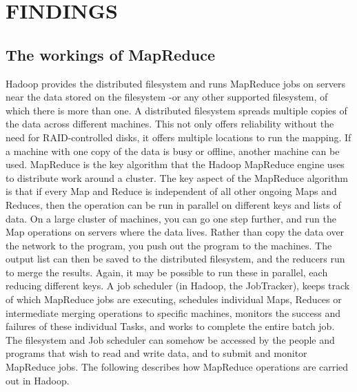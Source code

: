 \documentclass[a4paper,12pt,oneside]{report}
\begin{document}
\newpage
\section{FINDINGS}

\subsection{The workings of MapReduce}

Hadoop provides the distributed filesystem and runs MapReduce jobs on servers near the data stored on 
the filesystem -or any other supported filesystem, of which there is more than one.
A distributed filesystem spreads multiple copies of the data across different machines. This not only 
offers reliability without the need for RAID-controlled disks, it offers multiple locations to run the 
mapping. If a machine with one copy of the data is busy or offline, another machine can be used. 
MapReduce is the key algorithm that the Hadoop MapReduce engine uses to distribute work around a cluster. 
The key aspect of the MapReduce algorithm is that if every Map and Reduce is independent of all other 
ongoing Maps and Reduces, then the operation can be run in parallel on different keys and lists of data. 
On a large cluster of machines, you can go one step further, and run the Map operations on servers 
where the data lives. Rather than copy the data over the network to the program, you push out the program 
to the machines. The output list can then be saved to the distributed filesystem, and the reducers run 
to merge the results. Again, it may be possible to run these in parallel, each reducing different keys. 
A job scheduler (in Hadoop, the JobTracker), keeps track of which MapReduce jobs are executing, schedules 
individual Maps, Reduces or intermediate merging operations to specific machines, monitors the success 
and failures of these individual Tasks, and works to complete the entire batch job. 
The filesystem and Job scheduler can somehow be accessed by the people and programs that wish to read 
and write data, and to submit and monitor MapReduce jobs. 
The following describes how MapReduce operations are carried out in Hadoop. 
\end{document}
